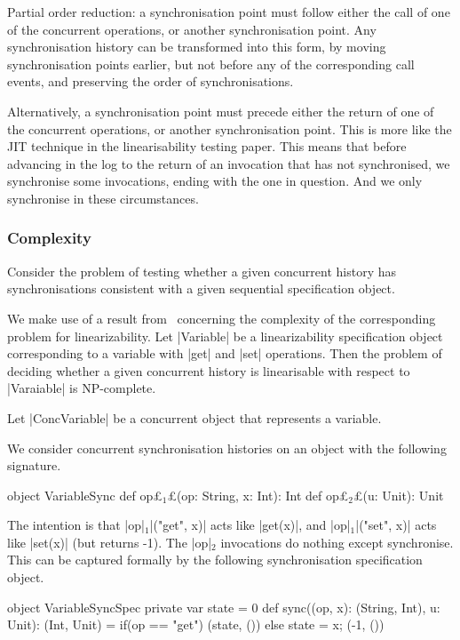 \documentclass[12pt,a4paper]{article}
\def\s#1{$_{#1}$}
\begin{document}
Partial order reduction: a synchronisation point must follow either the
call of one of the concurrent operations, or another synchronisation
point.  Any synchronisation history can be transformed into this form, by
moving synchronisation points earlier, but not before any of the corresponding
call events, and preserving the order of synchronisations.  

Alternatively, a synchronisation point must precede either the return of one
of the concurrent operations, or another synchronisation point.  This is more
like the JIT technique in the linearisability testing paper.  This means that
before advancing in the log to the return of an invocation that has not
synchronised, we synchronise some invocations, ending with the one in
question.  And we only synchronise in these circumstances. 


\subsubsection*{Complexity}

Consider the problem of testing whether a given concurrent history has
synchronisations consistent with a given sequential specification object. 

We make use of a result from~\cite{???} concerning the complexity of the
corresponding problem for linearizability.  Let |Variable| be a
linearizability specification object corresponding to a variable with |get|
and |set| operations.  Then the problem of deciding whether a given concurrent
history is linearisable with respect to |Varaiable| is NP-complete.

Let |ConcVariable| be a concurrent object that represents a variable.  

We consider concurrent synchronisation histories on an object with the
following signature.   
\begin{scala}
object VariableSync{
  def op£\s1£(op: String, x: Int): Int
  def op£\s2£(u: Unit): Unit
} 
\end{scala}
%
The intention is that |op|\s1|("get", x)| acts like |get(x)|, and
|op|\s1|("set", x)| acts like |set(x)| (but returns -1).  The |op|\s2
invocations do nothing except synchronise.  This can be captured formally by
the following synchronisation specification object.

\begin{scala}
object VariableSyncSpec{
  private var state = 0
  def sync((op, x): (String, Int), u: Unit): (Int, Unit) = 
    if(op == "get") (state, ()) else{ state = x; (-1, ()) }
}
\end{scala}
\end{document}
